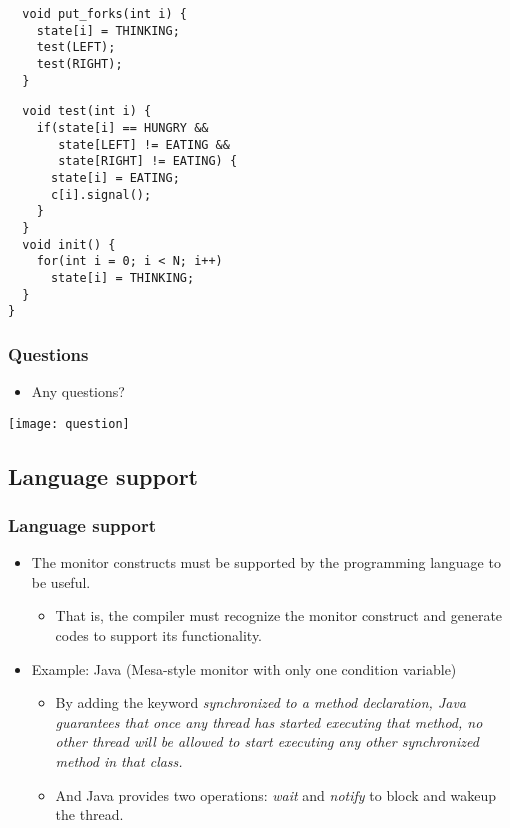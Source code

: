 \documentclass[CJKutf8,dvipsnames,table]{beamer}
\begin{document}
\begin{CJK*}{UTF8}{song}
\begin{frame}[fragile]
\begin{minipage}[c]{0.5\textwidth}
\begin{lstlisting}
  void put_forks(int i) {
    state[i] = THINKING;
    test(LEFT);
    test(RIGHT);
  }
\end{lstlisting}
  \end{minipage}

\begin{lstlisting}
  void test(int i) {
    if(state[i] == HUNGRY &&
       state[LEFT] != EATING &&
       state[RIGHT] != EATING) {
      state[i] = EATING;
      c[i].signal();
    }
  }
  void init() {
    for(int i = 0; i < N; i++)
      state[i] = THINKING;
  }
}
\end{lstlisting}

\end{frame}

  \begin{frame}
  \frametitle{Questions}
  \begin{itemize}
  \item Any questions? 
  \end{itemize}
  \begin{center}
    \texttt{[image: question]}
  \end{center}
  \end{frame}

  \subsection{Language support}

  \begin{frame}
 \frametitle{Language support} \pause
 \begin{itemize}
 \item The monitor constructs must be supported by the programming language to be useful.  \pause
   \begin{itemize}
   \item{That is, the compiler must recognize the monitor construct and
     generate codes to support its functionality.} \pause
   \end{itemize}
 \item Example: Java (Mesa-style monitor with only one condition variable)  \pause
     \begin{itemize}
     \item By adding the keyword \emph{synchronized  to a method declaration,
       Java guarantees that once any thread has started executing that method,
       no other thread will be allowed to start executing any other \emph{synchronized} method in that class.} \pause
     \item And Java provides two operations: \emph{wait} and \emph{notify} to block and wakeup the thread. 
     \end{itemize}
 \end{itemize}
  \end{frame}


\end{CJK*}
\end{document}

